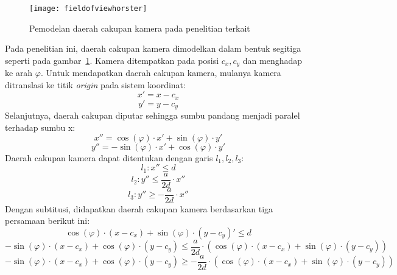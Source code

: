 \begin{figure}[H]
	\centering
	\texttt{[image: fieldofviewhorster]}
	\caption[Pemodelan daerah cakupan kamera pada penelitian terkait]{Pemodelan daerah cakupan kamera pada penelitian terkait}
	\label{fig:fieldofviewhorster}
\end{figure}
Pada penelitian ini, daerah cakupan kamera dimodelkan dalam bentuk segitiga seperti pada gambar~\ref{fig:fieldofviewhorster}. Kamera ditempatkan pada posisi \(c_x,c_y\) dan menghadap ke arah \(\varphi\). Untuk mendapatkan daerah cakupan kamera, mulanya kamera ditranslasi ke titik \textit{origin} pada sistem koordinat:
\begin{equation}
	x'=x-c_x
\end{equation}
\begin{equation}
	y'=y-c_y
\end{equation}
Selanjutnya, daerah cakupan diputar sehingga sumbu pandang menjadi paralel terhadap sumbu x:
\begin{equation}
	x''=\cos(\varphi)\cdot x'+\sin(\varphi)\cdot y'
\end{equation}
\begin{equation}
	y''=-\sin(\varphi)\cdot x'+\cos(\varphi)\cdot y'
\end{equation}
Daerah cakupan kamera dapat ditentukan dengan garis \(l_1,l_2,l_3\):
\begin{equation}
	l_1:x''\leq d
\end{equation}
\begin{equation}
	l_2:y''\leq \frac{a}{2d}\cdot x''
\end{equation}
\begin{equation}
	l_3:y''\geq-\frac{a}{2d}\cdot x''
\end{equation}
Dengan subtitusi, didapatkan daerah cakupan kamera berdasarkan tiga persamaan berikut ini:
\begin{equation}
	\cos(\varphi)\cdot(x-c_x)+\sin(\varphi)\cdot(y-c_y)'\leq d
	\label{eq:l1}
\end{equation}
\begin{equation}
	-\sin(\varphi)\cdot(x-c_x)+\cos(\varphi)\cdot(y-c_y)\leq \frac{a}{2d}\cdot (\cos(\varphi)\cdot(x-c_x)+\sin(\varphi)\cdot(y-c_y))	\label{eq:l2}
\end{equation}
\begin{equation}
	-\sin(\varphi)\cdot(x-c_x)+\cos(\varphi)\cdot(y-c_y)\geq- \frac{a}{2d}\cdot (\cos(\varphi)\cdot(x-c_x)+\sin(\varphi)\cdot(y-c_y))
	\label{eq:l3}
\end{equation}

